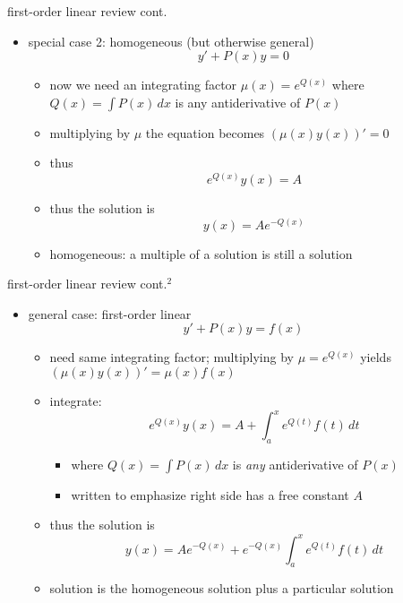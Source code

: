 \documentclass{beamer}
\begin{document}
\begin{frame}{first-order linear review cont.}

\begin{itemize}
\item special case 2: homogeneous (but otherwise general)
    $$y' + P(x) y = 0$$

    \begin{itemize}
    \item now we need an integrating factor $\mu(x) = e^{Q(x)}$ where $Q(x) = \int P(x)\,dx$ is any antiderivative of $P(x)$
    \item multiplying by $\mu$ the equation becomes $\left(\mu(x) y(x)\right)' = 0$
    \item thus
        $$e^{Q(x)} y(x) = A$$
    \item thus the solution is
        $$y(x) = A e^{-Q(x)}$$
    \item homogeneous: \alert{a multiple of a solution is still a solution}
    \end{itemize}
\end{itemize}
\end{frame}


\begin{frame}{first-order linear review cont.$^2$}

\begin{itemize}
\item general case: first-order linear
    $$y' + P(x) y = f(x)$$

    \begin{itemize}
    \item need same integrating factor; multiplying by $\mu=e^{Q(x)}$ yields $\left(\mu(x) y(x)\right)' = \mu(x) f(x)$
    \item integrate:
        $$e^{Q(x)} y(x) = A + \int_a^x e^{Q(t)} f(t)\,dt$$

        \begin{itemize}
        \item where $Q(x)=\int P(x)\,dx$ is \emph{any} antiderivative of $P(x)$
        \item written to emphasize right side has a free constant $A$
        \end{itemize}
    \item thus the solution is
        $$y(x) = A e^{-Q(x)} +  e^{-Q(x)} \int_a^x e^{Q(t)} f(t)\,dt$$
    \item \alert{solution is the homogeneous solution plus a particular solution}
    \end{itemize}
\end{itemize}
\end{frame}
\end{document}
